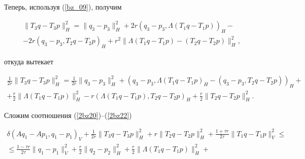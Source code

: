 \begin{pf}
\begin{equation}
\label{2bz21}


\end{equation}


Теперь, используя (\ref{bz_09}), получим


\begin{multline*}


\| {T_3 q-T_3 p} \|_H^2=\| {q_3-p_3} \|_H^2+


2 r (q_3-p_3, \Lambda (T_1 q-T_1 p))_H- \\


%


- 2 r (q_3-p_3, T_2 q-T_2 p)_H+


r^2 \| {\Lambda (T_1 q-T_1 p)-(T_2 q-T_2 p)} \|_H^2, 


\end{multline*}


откуда вытекает


\begin{multline}


\frac {1} {2 r} \| {T_3 q-T_3 p} \|_H^2=


\frac {1} {2 r} \| {q_3-p_3} \|_H^2+


(q_3-p_3, \Lambda (T_1 q-T_1 p)_H- 


(q_3-p_3, T_2 q-T_2 p))_H+ \\ +


\frac {r} {2} \| {\Lambda (T_1 q-T_1 p)} \|_H^2 - 


r (\Lambda (T_1 q-T_1 p), T_2 q-T_2 p)_H+


\frac {r} {2} \| {T_2 q-T_2 p} \|_H^2. 


\label{2bz22}


\end{multline}


Сложим соотношения (\ref{2bz20})--(\ref{2bz22})


\begin{multline*}


\delta (A q_1-A p_1, q_1-p_1)_V+


\frac {1} {2 r} \| {T_3 q-T_3 p} \|_H^2+ 


r \| {T_2 q-T_2 p} \|_H^2+


\frac {1+\tau r} {2 \tau} \| {T_1 q-T_1 p} \|_V^2 \leq \\


%


\le \frac {1-\tau r} {2 \tau} \| {q_1-p_1} \|_V^2+ 


\frac {r} {2} \| {q_2-p_2} \|_H^2+


\frac {r} {2} \| {\Lambda (T_1 q-T_1 p)} \|_H^2+ \\



\end{multline*}
\end{pf}
